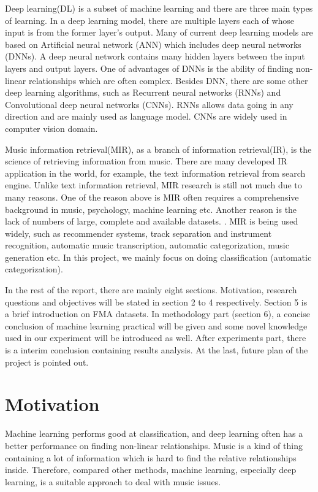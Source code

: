 \documentclass{article}
\begin{document}
Deep learning(DL) is a subset of machine learning and there are three main types of learning. In a deep learning model, there are multiple layers each of whose input is from the former layer's output. Many of current deep learning models are based on Artificial neural network (ANN) which includes deep neural networks (DNNs). \cite{hinton2006reducing} A deep neural network contains many hidden layers between the input layers and output layers. One of advantages of DNNs is the ability of finding non-linear relationships which are often complex. Besides DNN, there are some other deep learning algorithms, such as Recurrent neural networks (RNNs) \cite{medsker2001recurrent} and Convolutional deep neural networks (CNNs).\cite{lawrence1997face} RNNs allows data going in any direction and are mainly used as language model. CNNs are widely used in computer vision domain.

Music information retrieval(MIR), as a branch of information retrieval(IR), is the science of retrieving information from music. There are many developed IR application in the world, for example, the text information retrieval from search engine. Unlike text information retrieval, MIR research is still not much due to many reasons. One of the reason above is MIR often requires a comprehensive background in music, psychology, machine learning etc. Another reason is the lack of numbers of large, complete and available datasets. \cite{fma}. MIR is being used widely, such as recommender systems, track separation and instrument recognition, automatic music transcription, automatic categorization, music generation etc. In this project, we mainly focus on doing classification (automatic categorization).

In the rest of the report, there are mainly eight sections. Motivation, research questions and objectives will be stated in section 2 to 4 respectively. Section 5 is  a brief introduction on FMA datasets. In methodology part (section 6), a concise conclusion of machine learning practical will be given and some novel knowledge used in our experiment will be introduced as well.  After experiments part, there is  a interim conclusion containing results analysis. At the last, future plan of the project is pointed out.

\section{Motivation}
Machine learning performs good at classification, and deep learning often has a better performance on finding non-linear relationships. Music is a kind of thing containing a lot of information which is hard to find the relative relationships inside. Therefore, compared other methods, machine learning, especially deep learning, is a suitable approach to deal with music issues. 
\end{document}
